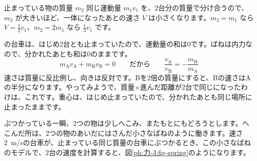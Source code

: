 \par\vspace{4pt}
\begin{phbaisuru}{止まっている物の質量 $m_2$}
同じ運動量 $m_1v_1$ を、2台分の質量で分け合うので、$m_2$ が大きいほど、一体になったあとの速さ $V$ は小さくなります。$m_2=m_1$ なら $V=\tfrac{1}{2}v_1$、$m_2=2m_1$ なら $\tfrac{1}{3}v_1$ です。
\par\smallskip\noindent{}
\end{phbaisuru}

\bkyattemiyouref の台車は、はじめ2台とも止まっていたので、運動量の和は0です。ばねは内力なので、分かれたあとも和は0のままです。
\[m_{\mathrm A}v_{\mathrm A}+m_{\mathrm B}v_{\mathrm B}=0\qquad\text{だから}\qquad \frac{v_{\mathrm A}}{v_{\mathrm B}}=-\frac{m_{\mathrm B}}{m_{\mathrm A}}\]
速さは質量に反比例し、向きは反対です。Bを2倍の質量にすると、Bの速さはAの半分になります。やってみようで、質量×進んだ距離が2台で同じになったわけは、これです。重心は、はじめ止まっていたので、分かれたあとも同じ場所に止まったままです。

\label{ph:力-3:sec4}
ぶつかっている一瞬、2つの物は少しへこみ、またもとにもどろうとします。へこんだ所は、2つの物のあいだにはさんだ小さなばねのように働きます。速さ\qty{2}{m/s}の台車が、止まっている同じ質量の台車にぶつかるとき、この小さなばねのモデルで、2台の速度を計算すると、図\ref{ph:力-3:fig-spring}のようになります。

